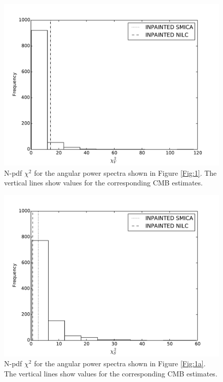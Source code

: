 \begin{figure}
\centering
\includegraphics[width=\textwidth]{figures/chapter-vsk/vchi2.pdf}
\caption{N-pdf $\chi^ 2$ for the angular power spectra shown in Figure \ref{Fig:1}. The vertical lines show values for the corresponding CMB estimates.}
\label{Fig:2}
\end{figure}

\begin{figure}
\centering
\includegraphics[width=\textwidth]{figures/chapter-vsk/schi2.pdf}
\caption{N-pdf $\chi^ 2$ for the angular power spectra shown in Figure \ref{Fig:1a}. The vertical lines show values for the corresponding CMB estimates.}
\label{Fig:2a}
\end{figure}

